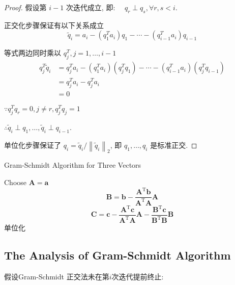 \begin{proof}
    假设第 $ i-1 $ 次迭代成立,  即: $ \quad q_{r} \perp q_{s}, \forall r, s<i $.

    正交化步骤保证有以下关系成立
    $$ \widetilde{q}_{i}=a_{i}-\left(q_{1}^{T} a_{i}\right) q_{1}-\cdots-\left(q_{i-1}^{T} a_{i}\right) q_{i-1} $$

    等式两边同时乘以 $ q_{j}^{T}, j=1, \ldots, i-1 $
    $$ \begin{aligned} q_{j}^{T} \tilde{q}_{i} &=q_{j}^{T} a_{i}-\left(q_{1}^{T} a_{i}\right)\left(q_{j}^{T} q_{1}\right)-\cdots-\left(q_{i-1}^{T} a_{i}\right)\left(q_{j}^{T} q_{i-1}\right) \\ &=q_{j}^{T} a_{i}-q_{j}^{T} a_{i}
        \\ &=0  \end{aligned} $$

    $ \because q_{j}^{T} q_{r}=0, j \neq r, q_{j}^{T} q_{j}=1 $

     $\therefore \widetilde{q}_{i} \perp q_{1}, \ldots, \widetilde{q}_{i} \perp q_{i-1} $.

    单位化步骤保证了 $ q_{i}=\widetilde{q}_{i} /\left\|\widetilde{q}_{i}\right\|_{2} $, 即 $ q_{1}, \ldots, q_{i} $ 是标准正交. 
\end{proof}

\begin{algorithm}
    \caption{Gram-Schmidt Algorithm for Three Vectors}
    Choose $ \boldsymbol{A}=\boldsymbol{a} $\;
    $$ \boldsymbol{B}=\boldsymbol{b}-\frac{\boldsymbol{A}^{\mathrm{T}} \boldsymbol{b}}{\boldsymbol{A}^{\mathrm{T}} \boldsymbol{A}} \boldsymbol{A} $$\;
    $$ \boldsymbol{C}=\boldsymbol{c}-\frac{\boldsymbol{A}^{\mathrm{T}} \boldsymbol{c}}{\boldsymbol{A}^{\mathrm{T}} \boldsymbol{A}} \boldsymbol{A}-\frac{\boldsymbol{B}^{\mathrm{T}} \boldsymbol{c}}{\boldsymbol{B}^{\mathrm{T}} \boldsymbol{B}} \boldsymbol{B}   $$\;
    单位化\;
\end{algorithm}

\subsection{The Analysis of Gram-Schmidt Algorithm}

假设Gram-Schmidt 正交法未在第$i$次迭代提前终止:

